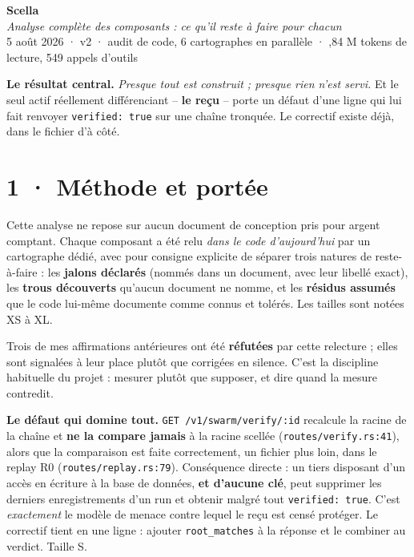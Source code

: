 \documentclass[10pt]{article}
\newcommand{\sz}[1]{{\small\color{grey}\textsf{#1}}}
\newcommand{\code}[1]{\texttt{\small #1}}
\begin{document}
\begin{center}
{\Huge\bfseries\color{navy} Scella}\\[4pt]
{\large\color{grey}\itshape Analyse complète des composants : ce qu'il reste à faire pour chacun}\\[4pt]
{\small\color{grey} 5 août 2026 · v2 \; · \; audit de code, 6 cartographes en parallèle \; · ,84 M tokens de lecture, 549 appels d'outils}
\end{center}
\vspace{2pt}

\begin{these}
\textbf{Le résultat central.} \emph{Presque tout est construit ; presque rien n'est servi.} Et le seul
actif réellement différenciant -- \textbf{le reçu} -- porte un défaut d'une ligne qui lui fait renvoyer
\code{verified: true} sur une chaîne tronquée. Le correctif existe déjà, dans le fichier d'à côté.
\end{these}

\section{1 · Méthode et portée}

Cette analyse ne repose sur aucun document de conception pris pour argent comptant. Chaque composant a
été relu \emph{dans le code d'aujourd'hui} par un cartographe dédié, avec pour consigne explicite de
séparer trois natures de reste-à-faire : les \textbf{jalons déclarés} (nommés dans un document, avec
leur libellé exact), les \textbf{trous découverts} qu'aucun document ne nomme, et les \textbf{résidus
assumés} que le code lui-même documente comme connus et tolérés. Les tailles sont notées XS à XL.

Trois de mes affirmations antérieures ont été \textbf{réfutées} par cette relecture ; elles sont
signalées à leur place plutôt que corrigées en silence. C'est la discipline habituelle du projet :
mesurer plutôt que supposer, et dire quand la mesure contredit.

\begin{alerte}
\textbf{Le défaut qui domine tout.} \code{GET /v1/swarm/verify/:id} recalcule la racine de la chaîne et
\textbf{ne la compare jamais} à la racine scellée (\code{routes/verify.rs:41}), alors que la comparaison
est faite correctement, un fichier plus loin, dans le replay R0 (\code{routes/replay.rs:79}).
Conséquence directe : un tiers disposant d'un accès en écriture à la base de données, \textbf{et
d'aucune clé}, peut supprimer les derniers enregistrements d'un run et obtenir malgré tout
\code{verified: true}. C'est \emph{exactement} le modèle de menace contre lequel le reçu est censé
protéger. Le correctif tient en une ligne : ajouter \code{root\_matches} à la réponse et le combiner
au verdict. \sz{Taille S.}
\end{alerte}
\end{document}
